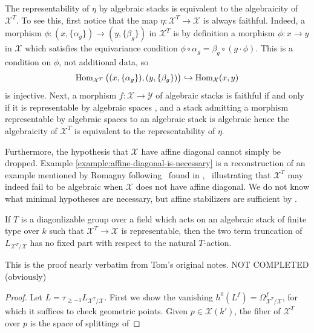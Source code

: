 \documentclass[12pt,dvipsnames]{amsart}
\newcommand{\red}[1]{\textcolor{Mahogany}{#1}}
\begin{document}
\begin{remark}\label{rl-000E}\label{rmk:algebraicity-is-representability}
  The representability of \(\eta\) by algebraic stacks is equivalent to the algebraicity of \(\mathcal X^T\). To see this, first notice that the map \(\eta:\mathcal X^T\to \mathcal X\) is always faithful. Indeed, a morphism \(\phi:(x,\{\alpha_g\})\to (y,\{\beta_g\})\) in \(\mathcal X^T\) is by definition a morphism \(\phi:x\to y\) in \(\mathcal X\) which satisfies the equivariance condition \(\phi\circ \alpha_g = \beta_g \circ (g\cdot \phi)\). This is a condition on \(\phi\), not additional data, so
  \[\operatorname{Hom}_{\mathcal X^T}\big((x,\{\alpha_g\}), (y,\{\beta_g\})\big) \hookrightarrow \operatorname{Hom}_{\mathcal X}(x,y)\]
  is injective. Next, a morphism \(f:\mathcal X\to \mathcal Y\) of algebraic stacks is faithful if and only if it is representable by algebraic spaces \cite[\href{https://stacks.math.columbia.edu/tag/04Y5}{Tag 04Y5}]{stacks-project}, and a stack admitting a morphism representable by algebraic spaces to an algebraic stack is algebraic \cite[\href{https://stacks.math.columbia.edu/tag/03YS}{Tag 03YS}]{stacks-project} hence the algebraicity of \(\mathcal X^T\) is equivalent to the representability of \(\eta\).
\end{remark}
Furthermore, the hypothesis that \(\mathcal X\) have affine diagonal cannot simply be dropped. Example \ref{example:affine-diagonal-is-necessary} is a reconstruction of an example mentioned by Romagny following~\cite[Theorem 1.2.2]{romagny_AlgebraicitySmoothnessFixed2022} found in \cite[Exp. IX, Rem. 7.4]{SGA3-2},~ illustrating that \(\mathcal X^T\) may indeed fail to be algebraic when \(\mathcal X\) does not have affine diagonal. We do not know what minimal hypotheses are necessary, but affine stabilizers are sufficient by \cite[Theorem A.20]{aranha-khan-latyntsev-etal_VirtualLocalizationRevisited2025}.
\begin{lemma}\label{rl-000F}\label{lem:two-term-truncation-of-fixed-locus-cotangent-complex-no-fixed-part}
  If \(T\) is a diagonlizable group over a field which acts on an algebraic stack of finite type over \(k\) such that \(\mathcal X^T\to \mathcal X\) is representable, then the two term truncation of \(L_{\mathcal X^T/\mathcal X}\) has no fixed part with respect to the natural \(T\)-action.
\end{lemma}
\red{This is the proof nearly verbatim from Tom's original notes. NOT COMPLETED (obviously)}
\begin{proof}
  Let \(L = \tau_{\geq -1}L_{\mathcal X^T/\mathcal X}\). First we show the vanishing \(h^0(L^f) = \Omega^f_{\mathcal X^T/\mathcal X}\), for which it suffices to check geometric points. Given \(p\in \mathcal X(k')\), the fiber of \(\mathcal X^T\) over \(p\) is the space of splittings of 
\end{proof}
\end{document}
